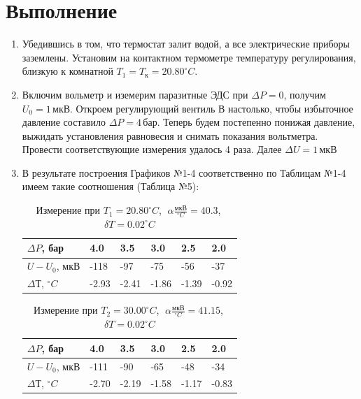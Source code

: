 \documentclass[a4paper,12pt]{article}
\begin{document}
	\section{Выполнение}
	\begin{enumerate}
		\item Убедившись в том, что термостат залит водой, а все электрические приборы заземлены. Установим на контактном термометре температуру  регулирования, близкую к комнатной $T_1 = T_к = 20.80^\circ C$.
		
		\item Включим вольметр и иземерим паразитные ЭДС при $\Delta P = 0$, получим $U_0 = 1 \, мкВ$. Откроем регулирующий вентиль В настолько, чтобы избыточное давление составило $\Delta P = 4 \, бар$. Теперь будем постепенно понижая давление, выжидать установления равновесия и снимать показания вольтметра. Провести соответствующие измерения удалось 4 раза.
		Далее $\Delta U = 1 \, мкВ$
		
		
		\item В результате построения Графиков №1-4 соответственно по Таблицам №1-4 имеем такие соотношения (Таблица №5):
		
		\begin{table}[h!] 
			\caption{Измерение при $T_1 = 20.80^\circ C$,$\;$ $\alpha\frac{мкВ}{^\circ C} = 40.3$,$\;$ $\delta T = 0.02^\circ C$}
			\begin{center}
				\begin{tabular}{|*{6}{l|}} \hline
					$\Delta P$, бар & 4.0 & 3.5 & 3.0 & 2.5 & 2.0 \\ \hline
					$U - U_0$, мкВ & -118 & -97 & -75 & -56 & -37 \\ \hline
					$\Delta Т$, $^\circ C$ & -2.93 & -2.41 & -1.86 & -1.39 & -0.92 \\ \hline
				\end{tabular}
			\end{center}
		\end{table}

		\begin{table}[h!] 
			\caption{Измерение при $T_2 = 30.00^\circ C$,$\;$ $\alpha\frac{мкВ}{^\circ C} = 41.15$,$\;$ $\delta T = 0.02^\circ C$}
			\begin{center}
				\begin{tabular}{|*{6}{l|}} \hline
					$\Delta P$, бар & 4.0 & 3.5 & 3.0 & 2.5 & 2.0 \\ \hline
					$U - U_0$, мкВ & -111 & -90 & -65 & -48 & -34 \\ \hline
					$\Delta Т$, $^\circ C$ & -2.70 & -2.19 & -1.58 & -1.17 & -0.83 \\ \hline
				\end{tabular}
			\end{center}
		\end{table}
	

\end{enumerate}
\end{document}
